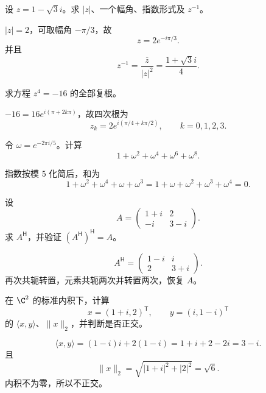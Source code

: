 %
%

\begin{exercise}[level=basic]
设 $z=1-\sqrt3i$。求 $|z|$、一个幅角、指数形式及 $z^{-1}$。
\begin{solution}
$|z|=2$，可取幅角 $-\pi/3$，故
\[
z=2e^{-i\pi/3}.
\]
并且
\[
z^{-1}=\frac{\overline z}{|z|^2}
=\frac{1+\sqrt3i}{4}.
\]
\end{solution}
\end{exercise}

\begin{exercise}[level=basic]
求方程 $z^4=-16$ 的全部复根。
\begin{solution}
$-16=16e^{i(\pi+2k\pi)}$，故四次根为
\[
z_k=2e^{i(\pi/4+k\pi/2)},
\qquad k=0,1,2,3.
\]
\end{solution}
\end{exercise}

\begin{exercise}[level=basic]
令 $\omega=e^{-2\pi i/5}$。计算
\[
1+\omega^2+\omega^4+\omega^6+\omega^8.
\]
\begin{solution}
指数按模 $5$ 化简后，和为
\[
1+\omega^2+\omega^4+\omega+\omega^3
=1+\omega+\omega^2+\omega^3+\omega^4=0.
\]
\end{solution}
\end{exercise}

\begin{exercise}[level=basic]
设
\[
A=\begin{pmatrix}1+i&2\\-i&3-i\end{pmatrix}.
\]
求 $A^{\mathsf H}$，并验证 $(A^{\mathsf H})^{\mathsf H}=A$。
\begin{solution}
\[
A^{\mathsf H}
=\begin{pmatrix}1-i&i\\2&3+i\end{pmatrix}.
\]
再次共轭转置，元素共轭两次并转置两次，恢复 $A$。
\end{solution}
\end{exercise}

\begin{exercise}[level=basic]
在 $\C^2$ 的标准内积下，计算
\[
x=(1+i,2)^{\mathsf T},\qquad y=(i,1-i)^{\mathsf T}
\]
的 $\langle x,y\rangle$、$\lVert x\rVert_2$，并判断是否正交。
\begin{solution}
\[
\langle x,y\rangle
=(1-i)i+2(1-i)=1+i+2-2i=3-i.
\]
且
\[
\lVert x\rVert_2=\sqrt{|1+i|^2+|2|^2}=\sqrt6.
\]
内积不为零，所以不正交。
\end{solution}
\end{exercise}

